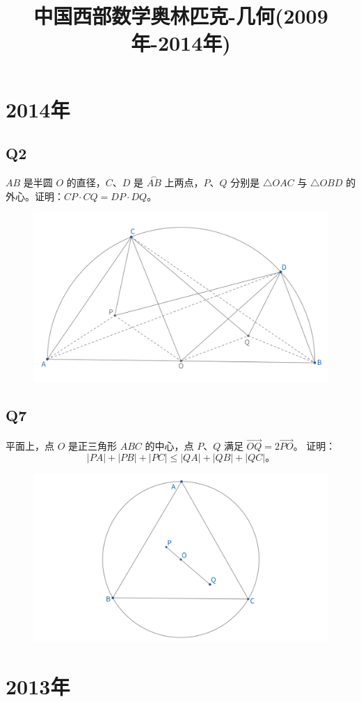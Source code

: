 \documentclass{article}
\title{中国西部数学奥林匹克-几何(2009年-2014年)}
\author{}
\date{}
\begin{document}
\maketitle

\section{2014年}
\subsection{Q2}
$AB$ 是半圆 $O$ 的直径，$C$、$D$ 是 $\overset{\frown}{AB}$ 上两点，$P$、$Q$ 分别是 $\triangle OAC$ 与 $\triangle OBD$ 的外心。证明：$CP \cdot CQ = DP \cdot DQ$。
\begin{figure}[htbp]
    \centering
    \includegraphics[width=0.5\linewidth]{figures/西部赛14年Q2.png}
\end{figure}


\subsection{Q7}
平面上，点 $O$ 是正三角形 $ABC$ 的中心，点 $P$、$Q$ 满足 $\overrightarrow{OQ} = 2\overrightarrow{PO}$。
证明：
$$
|PA| + |PB| + |PC| \leq |QA| + |QB| + |QC|。
$$
\begin{figure}[htbp]
    \centering
    \includegraphics[width=0.7\linewidth]{figures/西部赛14年Q7.png}
\end{figure}


\newpage 
\section{2013年}
\end{document}
